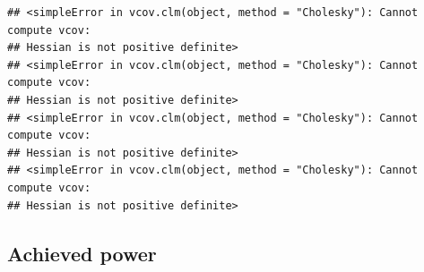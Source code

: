 \documentclass[
  bookmarksnumbered]{article}
\newenvironment{Shaded}{\begin{snugshade}}{\end{snugshade}}
\newcommand{\AttributeTok}[1]{\textcolor[rgb]{0.80,0.80,0.80}{#1}}
\newcommand{\CommentTok}[1]{\textcolor[rgb]{0.50,0.62,0.50}{#1}}
\newcommand{\FunctionTok}[1]{\textcolor[rgb]{0.94,0.94,0.56}{#1}}
\newcommand{\NormalTok}[1]{\textcolor[rgb]{0.80,0.80,0.80}{#1}}
\newcommand{\OtherTok}[1]{\textcolor[rgb]{0.94,0.94,0.56}{#1}}
\newcommand{\SpecialCharTok}[1]{\textcolor[rgb]{0.86,0.64,0.64}{#1}}
\newcommand{\StringTok}[1]{\textcolor[rgb]{0.80,0.58,0.58}{#1}}
\begin{document}
\begin{verbatim}
## <simpleError in vcov.clm(object, method = "Cholesky"): Cannot compute vcov: 
## Hessian is not positive definite>
## <simpleError in vcov.clm(object, method = "Cholesky"): Cannot compute vcov: 
## Hessian is not positive definite>
## <simpleError in vcov.clm(object, method = "Cholesky"): Cannot compute vcov: 
## Hessian is not positive definite>
## <simpleError in vcov.clm(object, method = "Cholesky"): Cannot compute vcov: 
## Hessian is not positive definite>
\end{verbatim}

\begin{Shaded}
\end{Shaded}

\hypertarget{achieved-power}{%
\subsection{Achieved power}\label{achieved-power}}
\end{document}
